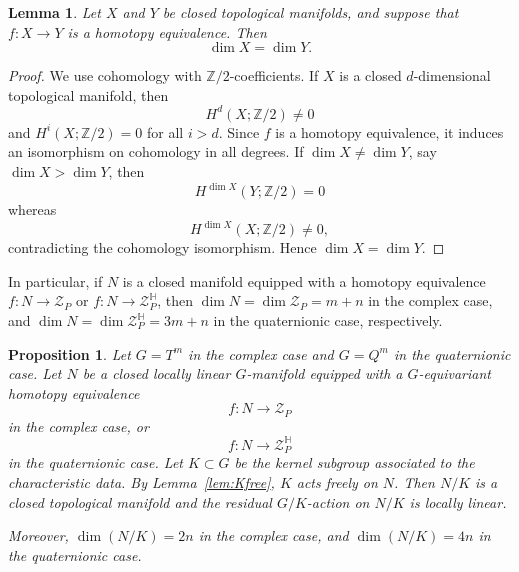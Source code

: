 \documentclass[11pt,a4paper]{article}
\numberwithin{equation}{section}
\newtheorem{prop}[definition]{Proposition}
\newtheorem{lemma}[definition]{Lemma}
\theoremstyle{named}
\begin{document}
\begin{lemma}\label{lem:dim_match}
Let \(X\) and \(Y\) be closed topological manifolds, and suppose that \(f:X\to Y\) is a homotopy equivalence. Then
\[
    \dim X=\dim Y.
\]
\end{lemma}
\begin{proof}
We use cohomology with \(\mathbb Z/2\)-coefficients.  If \(X\) is a closed \(d\)-dimensional topological manifold, then
\[
    H^d(X;\mathbb Z/2)\neq 0
\]
and \(H^i(X;\mathbb Z/2)=0\) for all \(i>d\).  Since \(f\) is a homotopy equivalence, it induces an isomorphism on cohomology in all degrees. If \(\dim X\neq \dim Y\), say \(\dim X>\dim Y\), then
\[
    H^{\dim X}(Y;\mathbb Z/2)=0
\]
whereas
\[
    H^{\dim X}(X;\mathbb Z/2)\neq 0,
\]
contradicting the cohomology isomorphism. Hence \(\dim X=\dim Y\).
\end{proof}

In particular, if \(N\) is a closed manifold equipped with a homotopy equivalence \(f:N\longrightarrow \mathcal Z_P\) or \(f:N\longrightarrow \mathcal Z_P^{\mathbb H}\), then \(\dim N=\dim \mathcal Z_P=m+n\) in the complex case, and \(\dim N=\dim \mathcal Z_P^{\mathbb H}=3m+n\) in the quaternionic case, respectively.

\begin{prop}\label{prop:quotient_manifold}
Let \(G=T^m\) in the complex case and \(G=Q^m\) in the quaternionic case.  Let \(N\) be a closed locally linear \(G\)-manifold equipped with a \(G\)-equivariant homotopy equivalence
\[
    f:N\longrightarrow \mathcal Z_P
\]
in the complex case, or
\[
    f:N\longrightarrow \mathcal Z_P^{\mathbb H}
\]
in the quaternionic case. Let \(K\subset G\) be the kernel subgroup associated to the characteristic data. By Lemma~\ref{lem:Kfree}, \(K\) acts freely on \(N\). Then \(N/K\) is a closed topological manifold and the residual \(G/K\)-action on \(N/K\) is locally linear.

Moreover, \(\dim(N/K)=2n\) in the complex case, and
\(\dim(N/K)=4n\) in the quaternionic case.
\end{prop}
\end{document}
